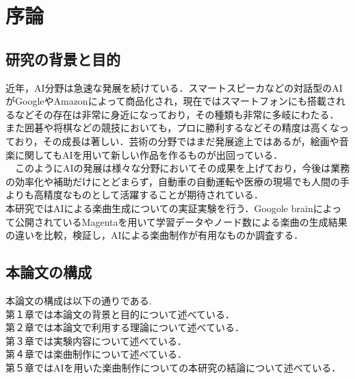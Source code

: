 \chapter{序論}

\section{研究の背景と目的}
近年，AI分野は急速な発展を続けている．スマートスピーカなどの対話型のAIがGoogleやAmazonによって商品化され，現在ではスマートフォンにも搭載されるなどその存在は非常に身近になっており，その種類も非常に多岐にわたる．\\
また囲碁や将棋などの競技においても，プロに勝利するなどその精度は高くなっており，その成長は著しい．芸術の分野ではまだ発展途上ではあるが，絵画や音楽に関してもAIを用いて新しい作品を作るものが出回っている．\\
　このようにAIの発展は様々な分野においてその成果を上げており，今後は業務の効率化や補助だけにとどまらず，自動車の自動運転や医療の現場でも人間の手よりも高精度なものとして活躍することが期待されている．\\
本研究ではAIによる楽曲生成についての実証実験を行う．Googole brainによって公開されているMagentaを用いて学習データやノード数による楽曲の生成結果の違いを比較，検証し，AIによる楽曲制作が有用なものか調査する．\\



\section{本論文の構成}
本論文の構成は以下の通りである.\\
第１章では本論文の背景と目的について述べている．\\
第２章では本論文で利用する理論について述べている．\\
第３章では実験内容について述べている．\\
第４章では楽曲制作について述べている．\\
第５章ではAIを用いた楽曲制作についての本研究の結論について述べている．\\

